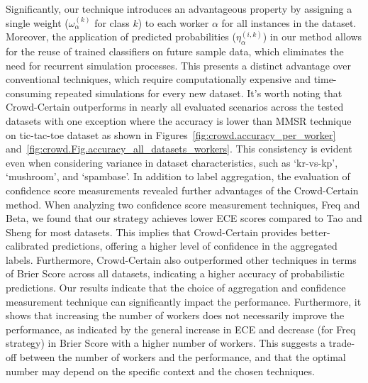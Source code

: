 \documentclass[sn-nature]{bst/sn-jnl}
\begin{document}
Significantly, our technique introduces an advantageous property by assigning a single weight ($\omega_{\alpha}^{(k)}$ for class $k$) to each worker $\alpha$ for all instances in the dataset. Moreover, the application of predicted probabilities ($\eta_{\alpha}^{(i,k)}$) in our method allows for the reuse of trained classifiers on future sample data, which eliminates the need for recurrent simulation processes. This presents a distinct advantage over conventional techniques, which require computationally expensive and time-consuming repeated simulations for every new dataset. It's worth noting that Crowd-Certain outperforms in nearly all evaluated scenarios across the tested datasets with one exception where the accuracy is lower than MMSR technique on tic-tac-toe dataset as shown in Figures~\ref{fig:crowd.accuracy_per_worker} and~\ref{fig:crowd.Fig.accuracy_all_datasets_workers}. This consistency is evident even when considering variance in dataset characteristics, such as `kr-vs-kp', `mushroom', and `spambase'.
In addition to label aggregation, the evaluation of confidence score measurements revealed further advantages of the Crowd-Certain method. When analyzing two confidence score measurement techniques, Freq and Beta, we found that our strategy achieves lower ECE scores compared to Tao and Sheng for most datasets. This implies that Crowd-Certain provides better-calibrated predictions, offering a higher level of confidence in the aggregated labels. Furthermore, Crowd-Certain also outperformed other techniques in terms of Brier Score across all datasets, indicating a higher accuracy of probabilistic predictions.
Our results indicate that the choice of aggregation and confidence measurement technique can significantly impact the performance. Furthermore, it shows that increasing the number of workers does not necessarily improve the performance, as indicated by the general increase in ECE and decrease (for Freq strategy) in Brier Score with a higher number of workers. This suggests a trade-off between the number of workers and the performance, and that the optimal number may depend on the specific context and the chosen techniques.
\end{document}
